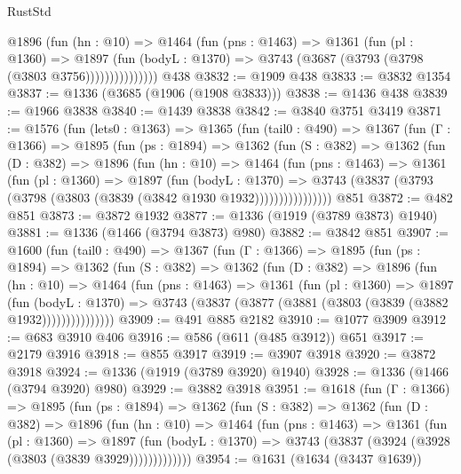 \begin{lexlean}{RustStd}
\begin{coremodule}
                @1896
                  (fun (hn : @10) =>
                  @1464
                    (fun (pns : @1463) =>
                    @1361
                      (fun (pl : @1360) =>
                      @1897
                        (fun (bodyL : @1370) =>
                        @3743 (@3687 (@3793 (@3798 (@3803 @3756)))))))))))))))
    @438
@3832 := @1909 @438
@3833 := @3832 @1354
@3837 := @1336 (@3685 (@1906 (@1908 @3833)))
@3838 := @1436 @438
@3839 := @1966 @3838
@3840 := @1439 @3838
@3842 := @3840 @3751 @3419
@3871 := @1576
    (fun (lets0 : @1363) =>
    @1365
      (fun (tail0 : @490) =>
      @1367
        (fun (Γ : @1366) =>
        @1895
          (fun (ps : @1894) =>
          @1362
            (fun (S : @382) =>
            @1362
              (fun (D : @382) =>
              @1896
                (fun (hn : @10) =>
                @1464
                  (fun (pns : @1463) =>
                  @1361
                    (fun (pl : @1360) =>
                    @1897
                      (fun (bodyL : @1370) =>
                      @3743 (@3837 (@3793 (@3798 (@3803 (@3839 (@3842 @1930 @1932))))))))))))))))
    @851
@3872 := @482 @851
@3873 := @3872 @1932
@3877 := @1336 (@1919 (@3789 @3873) @1940)
@3881 := @1336 (@1466 (@3794 @3873) @980)
@3882 := @3842 @851
@3907 := @1600
    (fun (tail0 : @490) =>
    @1367
      (fun (Γ : @1366) =>
      @1895
        (fun (ps : @1894) =>
        @1362
          (fun (S : @382) =>
          @1362
            (fun (D : @382) =>
            @1896
              (fun (hn : @10) =>
              @1464
                (fun (pns : @1463) =>
                @1361
                  (fun (pl : @1360) =>
                  @1897
                    (fun (bodyL : @1370) =>
                    @3743 (@3837 (@3877 (@3881 (@3803 (@3839 (@3882 @1932)))))))))))))))
@3909 := @491 @885 @2182
@3910 := @1077 @3909
@3912 := @683 @3910 @406
@3916 := @586 (@611 (@485 @3912)) @651
@3917 := @2179 @3916
@3918 := @855 @3917
@3919 := @3907 @3918
@3920 := @3872 @3918
@3924 := @1336 (@1919 (@3789 @3920) @1940)
@3928 := @1336 (@1466 (@3794 @3920) @980)
@3929 := @3882 @3918
@3951 := @1618
    (fun (Γ : @1366) =>
    @1895
      (fun (ps : @1894) =>
      @1362
        (fun (S : @382) =>
        @1362
          (fun (D : @382) =>
          @1896
            (fun (hn : @10) =>
            @1464
              (fun (pns : @1463) =>
              @1361
                (fun (pl : @1360) =>
                @1897
                  (fun (bodyL : @1370) =>
                  @3743 (@3837 (@3924 (@3928 (@3803 (@3839 @3929)))))))))))))
@3954 := @1631 (@1634 (@3437 @1639))

\end{coremodule}
\end{lexlean}
